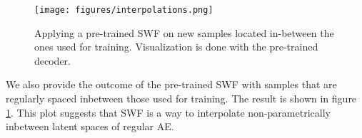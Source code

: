 \begin{figure}
\centering
\texttt{[image: figures/interpolations.png]}
\label{fig:interpolation}
\caption{Applying a pre-trained SWF on new samples located in-between the ones used for training. Visualization is done with the pre-trained decoder.}
\end{figure}

We also provide the outcome of the pre-trained SWF with samples that are regularly spaced inbetween those used for training. The result is shown in figure \ref{fig:interpolation}. This plot suggests that SWF is a way to interpolate non-parametrically inbetween latent spaces of regular AE.
























